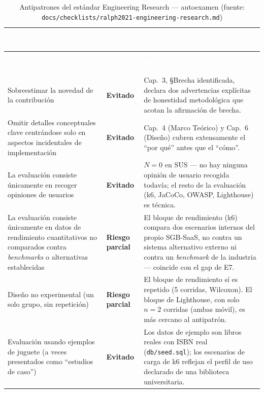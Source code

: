 \begin{center}
\scriptsize
\renewcommand{\arraystretch}{1.15}
\begin{longtable}{|p{4.5cm}|p{2.0cm}|p{7.0cm}|}
\caption{Antipatrones del estándar Engineering Research --- autoexamen
  (fuente: \texttt{docs/checklists/ralph2021-engineering-research.md})}
\label{tab:anexo-ralph-antipatrones}\\
\hline
\rowcolor{verdeuteq}
\textcolor{white}{\textbf{Antipatrón}} &
\textcolor{white}{\textbf{¿Se evitó?}} &
\textcolor{white}{\textbf{Nota}} \\
\hline
\endfirsthead
\hline
\rowcolor{verdeuteq}
\textcolor{white}{\textbf{Antipatrón}} &
\textcolor{white}{\textbf{¿Se evitó?}} &
\textcolor{white}{\textbf{Nota}} \\
\hline
\endhead
\hline
\endfoot
Sobreestimar la novedad de la contribución & \textbf{Evitado} & Cap.\ 3, §Brecha identificada, declara dos advertencias explícitas de honestidad metodológica que acotan la afirmación de brecha. \\
\hline
Omitir detalles conceptuales clave centrándose solo en aspectos incidentales de implementación & \textbf{Evitado} & Cap.\ 4 (Marco Teórico) y Cap.\ 6 (Diseño) cubren extensamente el ``por qué'' antes que el ``cómo''. \\
\hline
La evaluación consiste únicamente en recoger opiniones de usuarios & \textbf{Evitado} & $N=0$ en SUS --- no hay ninguna opinión de usuario recogida todavía; el resto de la evaluación (k6, JaCoCo, OWASP, Lighthouse) es técnica. \\
\hline
La evaluación consiste únicamente en datos de rendimiento cuantitativos no comparados contra \emph{benchmarks} o alternativas establecidas & \textbf{Riesgo parcial} & El bloque de rendimiento (k6) compara dos escenarios internos del propio SGB-SaaS, no contra un sistema alternativo externo ni contra un \emph{benchmark} de la industria --- coincide con el gap de E7. \\
\hline
Diseño no experimental (un solo grupo, sin repetición) & \textbf{Riesgo parcial} & El bloque de rendimiento sí es repetido (5 corridas, Wilcoxon). El bloque de Lighthouse, con solo $n=2$ corridas (ambas móvil), es más cercano al antipatrón. \\
\hline
Evaluación usando ejemplos de juguete (a veces presentados como ``estudios de caso'') & \textbf{Evitado} & Los datos de ejemplo son libros reales con ISBN real (\texttt{db/seed.sql}); los escenarios de carga de k6 reflejan el perfil de uso declarado de una biblioteca universitaria. \\
\hline
\end{longtable}
\end{center}

